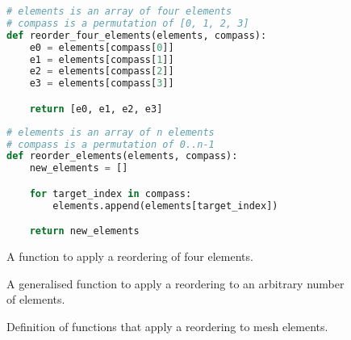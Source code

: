 \begin{figure}
\newsavebox{\reorderelements}
\begin{lrbox}{\reorderelements}
\begin{lstlisting}[language=python]
# elements is an array of four elements
# compass is a permutation of [0, 1, 2, 3]
def reorder_four_elements(elements, compass):
	e0 = elements[compass[0]]
	e1 = elements[compass[1]]
	e2 = elements[compass[2]]
	e3 = elements[compass[3]]

	return [e0, e1, e2, e3]
\end{lstlisting}
\end{lrbox}

\newsavebox{\reorderelementsb}
\begin{lrbox}{\reorderelementsb}
\begin{lstlisting}[language=python]
# elements is an array of n elements
# compass is a permutation of 0..n-1
def reorder_elements(elements, compass):
	new_elements = []

	for target_index in compass:
		elements.append(elements[target_index])

	return new_elements
\end{lstlisting}
\end{lrbox}

\sidebysideverticalnoncenter
{
\usebox{\reorderelements}
\caption{A function to apply a reordering of four elements.}
\label{subfig:reoder-four}
}
{
\usebox{\reorderelementsb}
\caption{A generalised function to apply a reordering to an arbitrary number of elements.}
\label{subfig:reorder-n}
}
\caption{Definition of functions that apply a reordering to mesh elements.}
\label{fig:reordering-funcs}
\end{figure}


